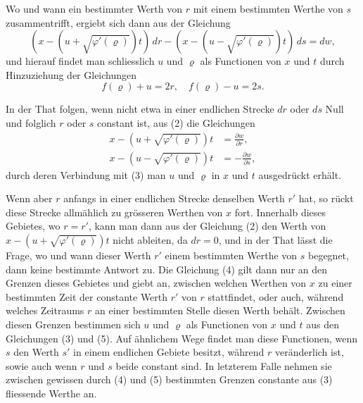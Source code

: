 \documentclass[12pt,a4paper]{article}
\begin{document}
Wo und wann ein bestimmter Werth von $r$ mit einem bestimmten Werthe von $s$ zusammentrifft, ergiebt sich dann aus der Gleichung
\begin{equation*}
(x - (u + \sqrt{\varphi'(\varrho)})t)\,dr - (x - (u - \sqrt{\varphi'(\varrho)})t)\,ds = dw,\tag{2}
\end{equation*}
und hierauf findet man schliesslich $u$ und $\varrho$ als Functionen von $x$ und $t$ durch Hinzuziehung der Gleichungen
\begin{equation*}
f(\varrho) + u = 2r,\quad f(\varrho) - u = 2s.\tag{3}
\end{equation*}

In der That folgen, wenn nicht etwa in einer endlichen Strecke $dr$ oder $ds$ Null und folglich $r$ oder $s$ constant ist, aus (2) die Gleichungen
\begin{align*}
x - (u + \sqrt{\varphi'(\varrho)})t &= \frac{\partial w}{\partial r},\\
x - (u - \sqrt{\varphi'(\varrho)})t &= -\frac{\partial w}{\partial s},\tag{4,5}
\end{align*}
durch deren Verbindung mit (3) man $u$ und $\varrho$ in $x$ und $t$ ausgedr\"uckt erh\"alt.

Wenn aber $r$ anfangs in einer endlichen Strecke denselben Werth $r'$ hat, so r\"uckt diese Strecke allm\"ahlich zu gr\"osseren Werthen von $x$ fort. Innerhalb dieses Gebietes, wo $r = r'$, kann man dann aus der Gleichung (2) den Werth von $x - (u + \sqrt{\varphi'(\varrho)})t$ nicht ableiten, da $dr = 0$, und in der That l\"asst die Frage, wo und wann dieser Werth $r'$ einem bestimmten Werthe von $s$ begegnet, dann keine bestimmte Antwort zu. Die Gleichung (4) gilt dann nur an den Grenzen dieses Gebietes und giebt an, zwischen welchen Werthen von $x$ zu einer bestimmten Zeit der constante Werth $r'$ von $r$ stattfindet, oder auch, w\"ahrend welches Zeitraums $r$ an einer bestimmten Stelle diesen Werth beh\"alt. Zwischen diesen Grenzen bestimmen sich $u$ und $\varrho$ als Functionen von $x$ und $t$ aus den Gleichungen (3) und (5). Auf \"ahnlichem Wege findet man diese Functionen, wenn $s$ den Werth $s'$ in einem endlichen Gebiete besitzt, w\"ahrend $r$ ver\"anderlich ist, sowie auch wenn $r$ und $s$ beide constant sind. In letzterem Falle nehmen sie zwischen gewissen durch (4) und (5) bestimmten Grenzen constante aus (3) fliessende Werthe an.
\end{document}
